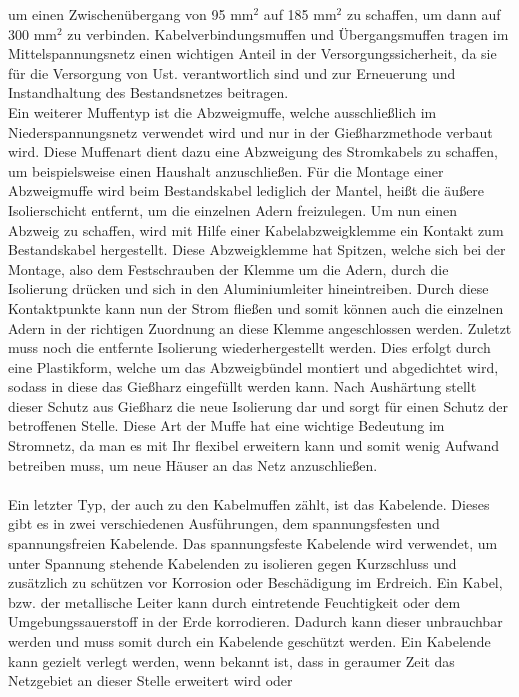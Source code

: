 um einen Zwischenübergang von 95 mm$^2$ auf 185 mm$^2$ zu schaffen, um dann auf 300 mm$^2$ zu verbinden. Kabelverbindungsmuffen und Übergangsmuffen tragen im 
Mittelspannungsnetz einen wichtigen Anteil in der Versorgungssicherheit, da sie für die Versorgung von Ust. verantwortlich sind und zur Erneuerung und 
Instandhaltung des Bestandsnetzes beitragen. \autocite{Cellpack}
\\
Ein weiterer Muffentyp ist die Abzweigmuffe, welche ausschließlich im Niederspannungsnetz verwendet wird und nur in der Gießharzmethode verbaut wird. Diese 
Muffenart dient dazu eine Abzweigung des Stromkabels zu schaffen, um beispielsweise einen Haushalt anzuschließen. Für die Montage einer Abzweigmuffe wird beim 
Bestandskabel lediglich der Mantel, heißt die äußere Isolierschicht entfernt, um die einzelnen Adern freizulegen. Um nun einen Abzweig zu schaffen, wird mit 
Hilfe einer Kabelabzweigklemme ein Kontakt zum Bestandskabel hergestellt. Diese Abzweigklemme hat Spitzen, welche sich bei der Montage, also dem Festschrauben 
der Klemme um die Adern, durch die Isolierung drücken und sich in den Aluminiumleiter hineintreiben. Durch diese Kontaktpunkte kann nun der Strom fließen und 
somit können auch die einzelnen Adern in der richtigen Zuordnung an diese Klemme angeschlossen werden. Zuletzt muss noch die entfernte Isolierung 
wiederhergestellt werden. Dies erfolgt durch eine Plastikform, welche um das Abzweigbündel montiert und abgedichtet wird, sodass in diese das Gießharz 
eingefüllt werden kann. Nach Aushärtung stellt dieser Schutz aus Gießharz die neue Isolierung dar und sorgt für einen Schutz der betroffenen Stelle. Diese 
Art der Muffe hat eine wichtige Bedeutung im Stromnetz, da man es mit Ihr flexibel erweitern kann und somit wenig Aufwand betreiben muss, um \zB neue Häuser 
an das Netz anzuschließen. \autocite{Cellpack}
\\\\
Ein letzter Typ, der auch zu den Kabelmuffen zählt, ist das Kabelende. Dieses gibt es in zwei verschiedenen Ausführungen, dem spannungsfesten und 
spannungsfreien Kabelende. Das spannungsfeste Kabelende wird verwendet, um unter Spannung stehende Kabelenden zu isolieren gegen Kurzschluss und zusätzlich 
zu schützen vor Korrosion oder Beschädigung im Erdreich. Ein Kabel, bzw. der metallische Leiter kann durch eintretende Feuchtigkeit oder dem 
Umgebungssauerstoff in der Erde korrodieren. Dadurch kann dieser unbrauchbar werden und muss somit durch ein Kabelende 
geschützt werden. Ein Kabelende kann gezielt verlegt werden, wenn \zB bekannt ist, dass in geraumer Zeit das Netzgebiet an dieser Stelle erweitert wird oder 
